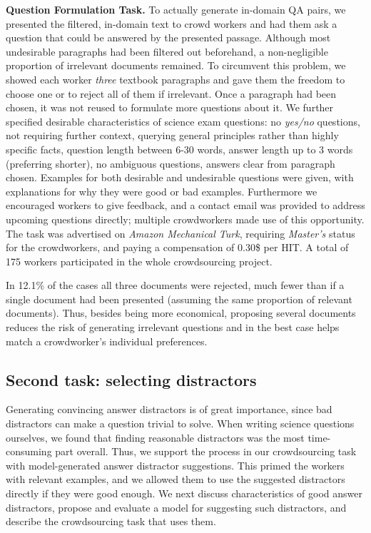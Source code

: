 \textbf{Question Formulation Task.} To actually generate in-domain QA pairs, we presented the filtered, in-domain text to crowd workers and had them ask a question that could be answered by the presented passage. Although most undesirable paragraphs had been filtered out beforehand, a non-negligible proportion of irrelevant documents remained. To circumvent this problem, we showed each worker \emph{three} textbook paragraphs and gave them the freedom to choose one or to reject all of them if irrelevant. Once a paragraph had been chosen, it was not reused to formulate more questions about it. We further specified desirable characteristics of science exam questions: no \emph{yes/no} questions, not requiring further context, querying general principles rather than highly specific facts, question length between 6-30 words, answer length up to 3 words (preferring shorter), no ambiguous questions, answers clear from paragraph chosen. Examples for both desirable and undesirable questions were given, with explanations for why they were good or bad examples. Furthermore we encouraged workers to give feedback, and a contact email was provided to address upcoming questions directly; multiple crowdworkers made use of this opportunity. The task was advertised on \emph{Amazon Mechanical Turk}, requiring \emph{Master's} status for the crowdworkers, and paying a compensation of 0.30\$ per HIT. A total of 175 workers participated in the whole crowdsourcing project. 

In 12.1\% of the cases all three documents were rejected, much fewer than if a single document had been presented (assuming the same proportion of relevant documents). Thus, besides being more economical, proposing several documents reduces the risk of generating irrelevant questions and in the best case helps match a crowdworker's individual preferences.

\subsection{Second task: selecting distractors}

Generating convincing answer distractors is of great importance, since bad distractors can make a question trivial to solve. When writing science questions ourselves, we found that finding reasonable distractors was the most time-consuming part overall.  Thus, we support the process in our crowdsourcing task with model-generated answer distractor suggestions. This primed the workers with relevant examples, and we allowed them to use the suggested distractors directly if they were good enough. We next discuss characteristics of good answer distractors, propose and evaluate a model for suggesting such distractors, and describe the crowdsourcing task that uses them.

